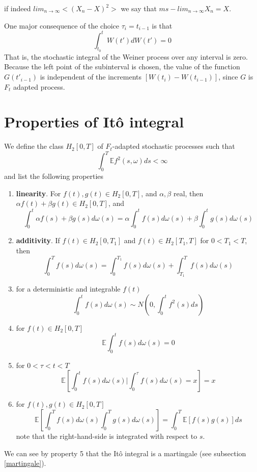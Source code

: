 \documentclass[12pt]{book}
\begin{document}
if indeed $lim_{n\rightarrow \infty}<(X_n-X)^2>$ we say that $ms-lim_{n\rightarrow \infty} X_n=X$.

One major consequence of the choice $\tau_i=t_{i-1}$ is that 
\begin{equation*}
\int_{t_0}^{t}W(t')dW(t')=0
\end{equation*}
That is, the stochastic integral of the Weiner process over any interval is zero.
Because the left point of the subinterval is chosen, the value of the function $G(t'_{i-1})$ is independent of the increments $[W(t_i)-W(t_{i-1})]$, since $G$ is $F_t$ adapted process.

\section{Properties of It\^{o} integral}\label{section_propertiesOfTheItoIntegral}
We define the class $H_2[0,T]$ of $F_t$-adapted stochastic processes such that 
\begin{equation*}
\int_0^T \mathbb{E}f^2(s,\omega)ds <\infty
\end{equation*}
and list the following properties
\begin{enumerate}
\item \textbf{linearity}. For $f(t),g(t)\in H_2[0,T]$, and $\alpha,\beta$ real, then $\alpha f(t)+\beta g(t) \in H_2[0,T]$, and 
\begin{equation*}
\int_0^t \alpha f(s)+\beta g(s) d\omega(s) = \alpha \int_0^t f(s)d\omega(s) +\beta \int_0^t g(s)d\omega(s)
\end{equation*}
\item \textbf{additivity}. If $f(t)\in H_2[0,T_1]$ and $f(t)\in H_2[T_1,T]$ for $0<T_1<T$, then 
\begin{equation*}
\int_0^Tf(s)d\omega(s) = \int_0^{T_1}f(s)d\omega(s) +\int_{T_1}^T f(s)d\omega(s)
\end{equation*}
\item for a deterministic and integrable $f(t)$
\begin{equation*}
\int_0^t f(s)d\omega(s) \sim N\left(0,\int_0^t f^2(s)ds\right)
\end{equation*}
\item for $f(t)\in H_2[0,T]$
\begin{equation*}
\mathbb{E}\int_0^t f(s)d\omega(s) = 0
\end{equation*}
\item for $0<\tau<t<T$  
\begin{equation*}
\mathbb{E}\left[\int_0^t f(s)d\omega(s)  | \int_0^\tau f(s)d\omega(s)=x \right] =x 
\end{equation*}
\item for $f(t),g(t)\in H_2[0,T]$
\begin{equation*}
\mathbb{E}\left[\int_0^Tf(s)d\omega(s)\int_0^T g(s)d\omega(s)\right]=\int_0^T\mathbb{E}[f(s)g(s)]ds
\end{equation*}
note that the right-hand-side is integrated with respect to $s$.
\end{enumerate}
We can see by property 5 that the It\^{o} integral is a martingale (see subsection \ref{martingale}).
\end{document}
